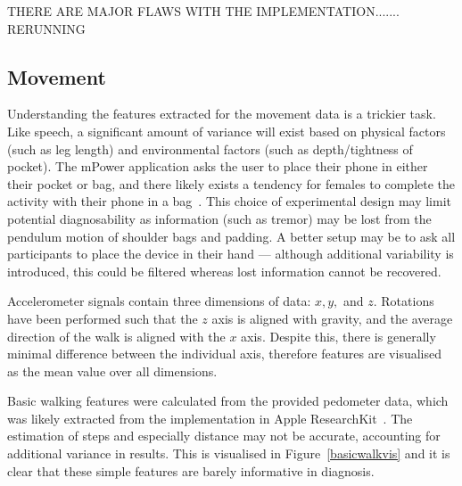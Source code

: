\documentclass[12pt, twoside]{book}
\begin{document}
THERE ARE MAJOR FLAWS WITH THE IMPLEMENTATION....... RERUNNING

\subsection{Movement}
Understanding the features extracted for the movement data is a trickier task. Like speech, a significant amount of variance will exist based on physical factors (such as leg length) and environmental factors (such as depth/tightness of pocket). The mPower application asks the user to place their phone in either their pocket or bag, and there likely exists a tendency for females to complete the activity with their phone in a bag~\cite{femalephone}. This choice of experimental design may limit potential diagnosability as information (such as tremor) may be lost from the pendulum motion of shoulder bags and padding. A better setup may be to ask all participants to place the device in their hand --- although additional variability is introduced, this could be filtered whereas lost information cannot be recovered.

Accelerometer signals contain three dimensions of data: $x, y,$ and $z$. Rotations have been performed such that the $z$ axis is aligned with gravity, and the average direction of the walk is aligned with the $x$ axis. Despite this, there is generally minimal difference between the individual axis, therefore features are visualised as the mean value over all dimensions.

Basic walking features were calculated from the provided pedometer data, which was likely extracted from the implementation in Apple ResearchKit~\cite{mpower}. The estimation of steps and especially distance may not be accurate, accounting for additional variance in results. This is visualised in Figure~\ref{basicwalkvis} and it is clear that these simple features are barely informative in diagnosis.
\end{document}
